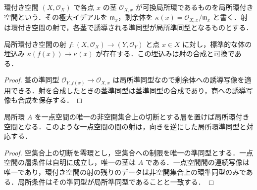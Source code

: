 \begin{defn}[局所環付き空間]
環付き空間 $(X,\mathcal O_X)$ で各点 $x$ の茎 $\mathcal O_{X,x}$ が可換局所環であるものを局所環付き空間という．その極大イデアルを $\mathfrak m_x$，剰余体を $\kappa(x)=\mathcal O_{X,x}/\mathfrak m_x$ と書く．射は環付き空間の射で，各茎で誘導される準同型が局所準同型となるものとする．
\end{defn}
\begin{prop}[局所環付き空間の射と剰余体]
局所環付き空間の射 $f:(X,\mathcal O_X)\to(Y,\mathcal O_Y)$ と点 $x\in X$ に対し，標準的な体の埋込み $\kappa(f(x))\to\kappa(x)$ が存在する．この埋込みは射の合成と可換である．
\end{prop}
\begin{proof}
茎の準同型 $\mathcal O_{Y,f(x)}\to\mathcal O_{X,x}$ は局所準同型なので剰余体への誘導写像を適用できる．射を合成したときの茎準同型は茎準同型の合成であり，商への誘導写像も合成を保存する．
\end{proof}
\begin{example}[局所環の一点空間]
局所環 $A$ を一点空間の唯一の非空開集合上の切断とする層を置けば局所環付き空間となる．このような一点空間の間の射は，向きを逆にした局所環準同型と対応する．
\end{example}
\begin{proof}
空集合上の切断を零環とし，空集合への制限を唯一の準同型とする．一点空間の層条件は自明に成立し，唯一の茎は $A$ である．一点空間間の連続写像は唯一であり，環付き空間の射の残りのデータは非空開集合上の環準同型のみである．局所条件はその準同型が局所準同型であることと一致する．
\end{proof}
